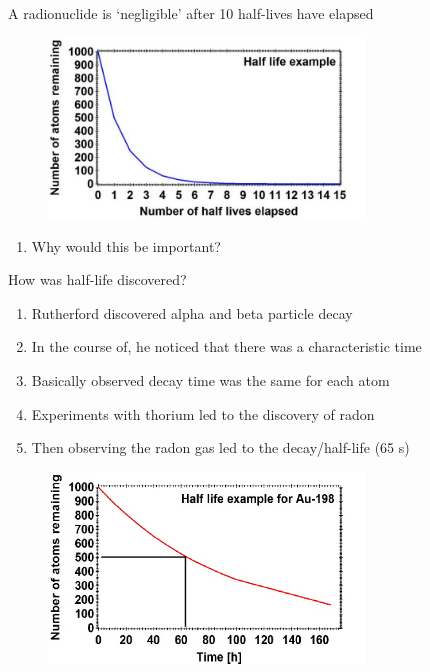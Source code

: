 \documentclass[aspectratio=1610,pdftex,dvipsnames,compress,xcolor={dvipsnames}]{beamer}
\begin{document}
\begin{frame}{A radionuclide is `negligible' after 10 half-lives have elapsed}

    \begin{figure}
        \centering
        \includegraphics[width=0.75\textwidth]{half.life.example.jpg}
    \end{figure}

    \vspace*{\fill}

    \begin{enumerate}[series=outerlist,topsep=0pt,itemsep=21pt,leftmargin=*,label=(\arabic*)]
        \item[]Why would this be important?
    \end{enumerate}
\end{frame}


\begin{frame}{How was half-life discovered?}
    \begin{enumerate}[series=outerlist,topsep=0pt,itemsep=21pt,leftmargin=*,label=(\arabic*)]
        \item[]Rutherford discovered alpha and beta particle decay
        \item[]In the course of, he noticed that there was a characteristic time
        \item[]Basically observed decay time was the same for each atom
        \item[]Experiments with thorium led to the discovery of radon
        \item[]Then observing the radon gas led to the decay/half-life (65 s)
    \end{enumerate}
\end{frame}


\begin{frame}{}
    \begin{figure}
        \centering
        \includegraphics[width=0.75\textwidth]{au198.linear.jpg}
    \end{figure}
\end{frame}
\end{document}
